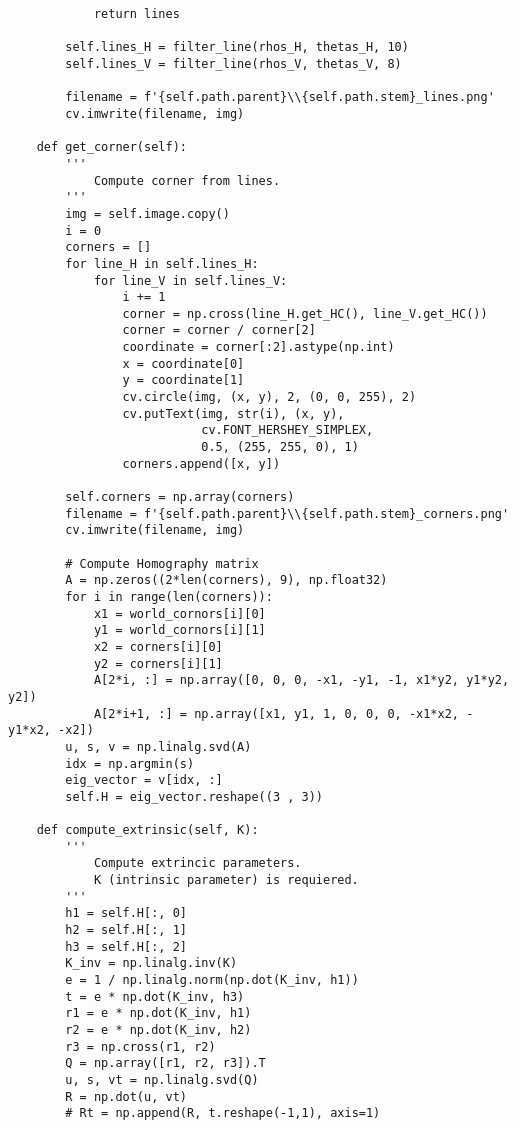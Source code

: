 \documentclass[11pt]{article}
\begin{document}
\begin{lstlisting}
            return lines

        self.lines_H = filter_line(rhos_H, thetas_H, 10)
        self.lines_V = filter_line(rhos_V, thetas_V, 8)

        filename = f'{self.path.parent}\\{self.path.stem}_lines.png'
        cv.imwrite(filename, img)

    def get_corner(self):
        '''
            Compute corner from lines.
        '''
        img = self.image.copy()
        i = 0
        corners = []
        for line_H in self.lines_H:
            for line_V in self.lines_V:
                i += 1
                corner = np.cross(line_H.get_HC(), line_V.get_HC())
                corner = corner / corner[2]
                coordinate = corner[:2].astype(np.int)
                x = coordinate[0]
                y = coordinate[1]
                cv.circle(img, (x, y), 2, (0, 0, 255), 2)
                cv.putText(img, str(i), (x, y), 
                           cv.FONT_HERSHEY_SIMPLEX, 
                           0.5, (255, 255, 0), 1)
                corners.append([x, y])
            
        self.corners = np.array(corners)    
        filename = f'{self.path.parent}\\{self.path.stem}_corners.png'
        cv.imwrite(filename, img)

        # Compute Homography matrix
        A = np.zeros((2*len(corners), 9), np.float32)
        for i in range(len(corners)):
            x1 = world_cornors[i][0]
            y1 = world_cornors[i][1]
            x2 = corners[i][0]
            y2 = corners[i][1]
            A[2*i, :] = np.array([0, 0, 0, -x1, -y1, -1, x1*y2, y1*y2, y2])
            A[2*i+1, :] = np.array([x1, y1, 1, 0, 0, 0, -x1*x2, -y1*x2, -x2])
        u, s, v = np.linalg.svd(A)
        idx = np.argmin(s)
        eig_vector = v[idx, :]
        self.H = eig_vector.reshape((3 , 3))

    def compute_extrinsic(self, K):
        '''
            Compute extrincic parameters.
            K (intrinsic parameter) is requiered.
        '''
        h1 = self.H[:, 0]
        h2 = self.H[:, 1]
        h3 = self.H[:, 2]
        K_inv = np.linalg.inv(K)
        e = 1 / np.linalg.norm(np.dot(K_inv, h1))
        t = e * np.dot(K_inv, h3)
        r1 = e * np.dot(K_inv, h1)
        r2 = e * np.dot(K_inv, h2)
        r3 = np.cross(r1, r2)
        Q = np.array([r1, r2, r3]).T
        u, s, vt = np.linalg.svd(Q)
        R = np.dot(u, vt)
        # Rt = np.append(R, t.reshape(-1,1), axis=1)
        

\end{lstlisting}
\end{document}
